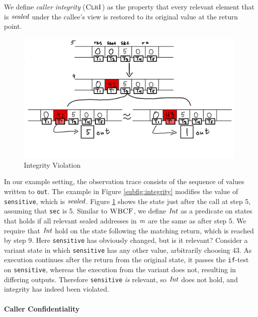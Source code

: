 \documentclass[10pt,conference]{ieeetran}%
\theoremstyle{definition}
\begin{document}
We define \emph{caller integrity} (\(\textnormal{\sc ClrI}\))  as the property that
every relevant element that is \(\mathit{sealed}\) under the callee's view is restored
to its original value at the return point.

\begin{figure}
  \includegraphics[width=\columnwidth]{variants.png}
  \caption{Integrity Violation}
  \label{fig:variant}
\end{figure}

In our example setting, the observation trace consists of the sequence
of values written to {\tt out}.
The example in Figure \ref{subfig:integrity} modifies the value of {\tt sensitive},
which is \(\mathit{sealed}\). Figure \ref{fig:variant} shows the state just after the call at step 5,
assuming that {\tt sec} is 5. Similar to \(\textnormal{\sc WBCF}\), we define
\(\mathit{Int}\) as a predicate on states that holds if
all relevant sealed addresses in \(m\) are the same as after step 5.
We require that \(\mathit{Int}\) hold on the state following the matching return,
which is reached by step 9. Here {\tt sensitive} has obviously changed, but is it relevant?
Consider a variant state in which {\tt sensitive} has any other value, arbitrarily
choosing 43. As execution continues after the return
from the original state, it passes the {\tt if}-test on {\tt sensitive}, whereas the execution
from the variant does not, resulting in differing outputs. Therefore {\tt sensitive} \emph{is} relevant,
so \(\mathit{Int}\) does not hold, and integrity has indeed been violated.

\paragraph*{Caller Confidentiality}
\end{document}

